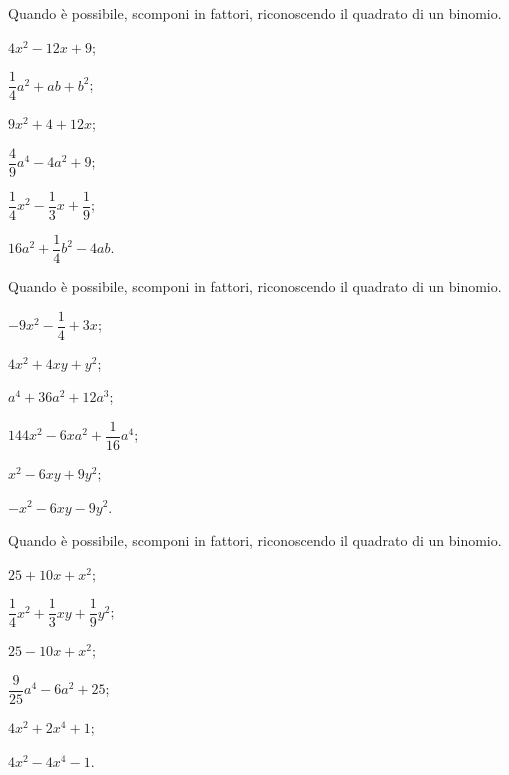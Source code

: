 \begin{esercizio}
\label{ese:13.36}
Quando è possibile, scomponi in fattori, riconoscendo il quadrato di un binomio.
\begin{multicols}{3}
\begin{enumeratea}
 \item $4x^{2}-12x+9$;
 \item $\dfrac{1}{4}a^{2}+ab+b^{2}$;
 \item $9x^{2}+4+12x$;
 \item $\dfrac{4}{9}a^{{4}}-4a^{2}+9$;
 \item $\dfrac{1}{4}x^{2}-\dfrac{1}{3}x+\dfrac{1}{9}$;
 \item $16a^{2}+\dfrac{1}{4}b^{2}-4ab$.
\end{enumeratea}
\end{multicols}
\end{esercizio}

\begin{esercizio}
\label{ese:13.37}
Quando è possibile, scomponi in fattori, riconoscendo il quadrato di un binomio.
\begin{multicols}{3}
\begin{enumeratea}
 \item $-9x^{2}-\dfrac{1}{4}+3x$;
 \item $4x^{2}+4xy+y^{2}$;
 \item $a^{4}+36a^{2}+12a^{3}$;
 \item $144x^{2}-6xa^{2}+\dfrac{1}{16}a^{4}$;
 \item $x^{2}-6xy+9y^{2}$;
 \item $-x^{2}-6xy-9y^{2}$.
\end{enumeratea}
\end{multicols}
\end{esercizio}

\begin{esercizio}
\label{ese:13.38}
Quando è possibile, scomponi in fattori, riconoscendo il quadrato di un binomio.
\begin{multicols}{3}
\begin{enumeratea}
 \item $25+10x+x^{2}$;
 \item $\dfrac{1}{4}x^{2}+\dfrac{1}{3}xy+\dfrac{1}{9}y^{2}$;
 \item $25-10x+x^{2}$;
 \item $\dfrac{9}{25}a^{4}-6a^{2}+25$;
 \item $4x^{2}+2x^{4}+1$;
 \item $4x^{2}-4x^{4}-1$.
\end{enumeratea}
\end{multicols}
\end{esercizio}


